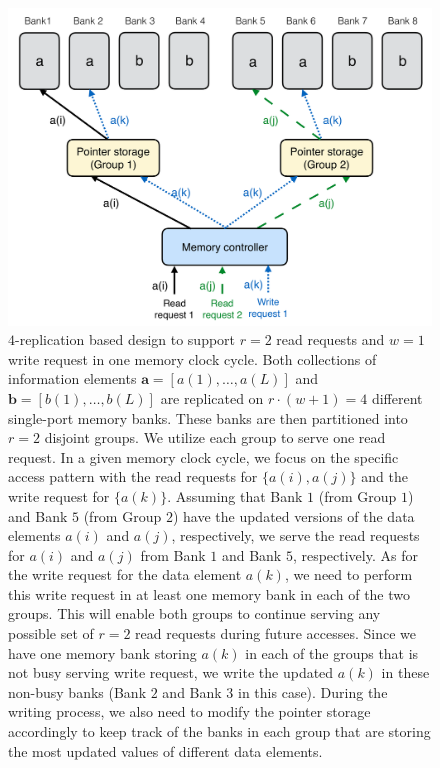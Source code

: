 \begin{figure}[t!]
\centering
\includegraphics[width=0.86\linewidth]{fig/rw-replication.pdf}
\caption{$4$-replication based design to support $r = 2$ read requests and $w = 1$ write request in one memory clock cycle. Both collections of information elements $\mathbf{a} = [a(1),\ldots, a(L)]$ and $\mathbf{b} = [b(1),\ldots, b(L)]$ are replicated on $r\cdot (w + 1) = 4$ different single-port memory banks. These banks are then partitioned into $r = 2$ disjoint groups. We utilize each group to serve one read request. In a given memory clock cycle, we focus on the specific access pattern with the read requests for $\{a(i), a(j)\}$ and the write request for $\{a(k)\}$. Assuming that Bank $1$ (from Group $1$) and Bank $5$ (from Group $2$) have the updated versions of the data elements $a(i)$ and $a(j)$, respectively, we serve the read requests for $a(i)$ and $a(j)$ from Bank $1$ and Bank $5$, respectively. As for the write request for the data element $a(k)$, we need to perform this write request in at least one memory bank in each of the two groups. This will enable both groups to continue serving any possible set of $r = 2$ read requests during future accesses. Since we have one memory bank storing $a(k)$ in each of the groups that is not busy serving write request, we write the updated $a(k)$ in these non-busy banks (Bank $2$ and Bank $3$ in this case). During the writing process, we also need to modify the pointer storage accordingly to keep track of the banks in each group that are storing the most updated values of different data elements.}
\label{fig:rw_replication}
\end{figure}
